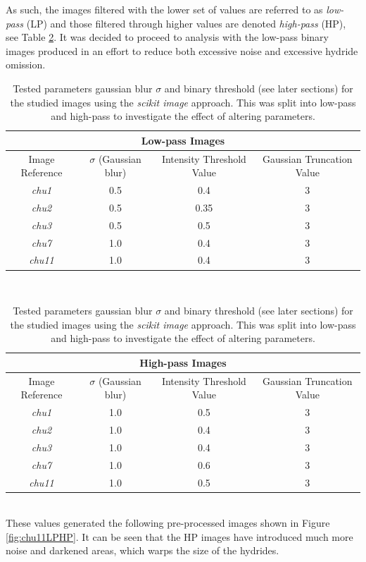\documentclass{article}
\begin{document}
	As such, the images filtered with the lower set of values are referred to as \textit{low-pass} (LP) and those filtered through higher values are denoted \textit{high-pass} (HP), see Table \ref{tab:imageprocessing}. It was decided to proceed to analysis with the low-pass binary images produced in an effort to reduce both excessive noise and excessive hydride omission.
	\\
	\begin{table}[ht]
	\begin{center}
	\begin{tabular}{ |c|c|c|c| } 
		\hline
		\multicolumn{4}{|c|}{Low-pass Images} \\
		\hline
		Image Reference & $\sigma$ (Gaussian blur) & Intensity Threshold Value & Gaussian Truncation Value \\
		\hline
		\textit{chu1} & 0.5 & 0.4 & 3 \\ 
		\textit{chu2} & 0.5 & 0.35 & 3 \\ 
		\textit{chu3} & 0.5 & 0.5 & 3 \\ 
		\textit{chu7} & 1.0 & 0.4 & 3 \\ 
		\textit{chu11} & 1.0 & 0.4 & 3 \\ 
		\hline
	\end{tabular}
	\\
	\begin{tabular}{ |c|c|c|c| } 
		\hline
		\multicolumn{4}{|c|}{High-pass Images} \\
		\hline
		Image Reference & $\sigma$ (Gaussian blur) & Intensity Threshold Value & Gaussian Truncation Value \\
		\hline
		\textit{chu1} & 1.0 & 0.5 & 3 \\ 
		\textit{chu2} & 1.0 & 0.4 & 3 \\ 
		\textit{chu3} & 1.0 & 0.4 & 3 \\ 
		\textit{chu7} & 1.0 & 0.6 & 3 \\ 
		\textit{chu11} & 1.0 & 0.5 & 3 \\ 
		\hline
	\end{tabular}
	\caption{Tested parameters gaussian blur $\sigma$ and binary threshold (see later sections) for the studied images using the \textit{scikit image} approach. This was split into low-pass and high-pass to investigate the effect of altering parameters.}
	\label{tab:imageprocessing}
	\end{center}
	\end{table}
	\\
These values generated the following pre-processed images shown in Figure \ref{fig:chu11LPHP}. It can be seen that the HP images have introduced much more noise and darkened areas, which warps the size of the hydrides.
\end{document}
